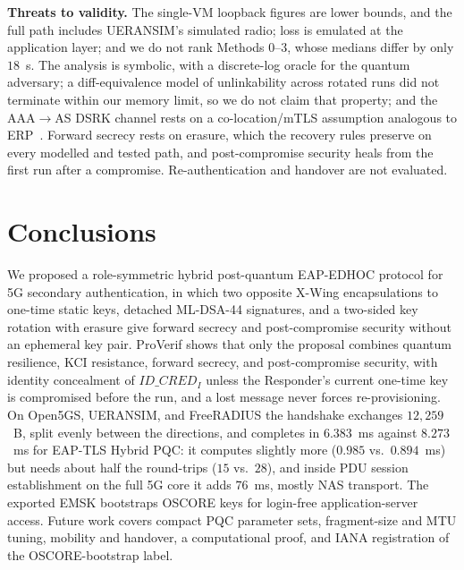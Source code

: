 \documentclass[symmetry,article,submit,moreauthors]{Definitions/mdpi}
\begin{document}
\textbf{Threats to validity.} The single-VM loopback figures are lower bounds, and the full path includes UERANSIM's simulated radio; loss is emulated at the application layer; and we do not rank Methods 0--3, whose medians differ by only $18$~\textmu s. The analysis is symbolic, with a discrete-log oracle for the quantum adversary; a diff-equivalence model of unlinkability across rotated runs did not terminate within our memory limit, so we do not claim that property; and the AAA$\to$AS DSRK channel rests on a co-location/mTLS assumption analogous to ERP~\cite{RFC6696}. Forward secrecy rests on erasure, which the recovery rules preserve on every modelled and tested path, and post-compromise security heals from the first run after a compromise. Re-authentication and handover are not evaluated.

\section{Conclusions}
\label{sec:conclusion}
We proposed a role-symmetric hybrid post-quantum EAP-EDHOC protocol for 5G secondary authentication, in which two opposite X-Wing encapsulations to one-time static keys, detached ML-DSA-44 signatures, and a two-sided key rotation with erasure give forward secrecy and post-compromise security without an ephemeral key pair. ProVerif shows that only the proposal combines quantum resilience, KCI resistance, forward secrecy, and post-compromise security, with identity concealment of $\mathit{ID\_CRED}_I$ unless the Responder's current one-time key is compromised before the run, and a lost message never forces re-provisioning. On Open5GS, UERANSIM, and FreeRADIUS the handshake exchanges $12{,}259$~B, split evenly between the directions, and completes in $6.383$~ms against $8.273$~ms for EAP-TLS Hybrid PQC: it computes slightly more ($0.985$ vs.\ $0.894$~ms) but needs about half the round-trips ($15$ vs.\ $28$), and inside PDU session establishment on the full 5G core it adds $76$~ms, mostly NAS transport. The exported EMSK bootstraps OSCORE keys for login-free application-server access. Future work covers compact PQC parameter sets, fragment-size and MTU tuning, mobility and handover, a computational proof, and IANA registration of the OSCORE-bootstrap label.

\vspace{6pt}

\end{document}
